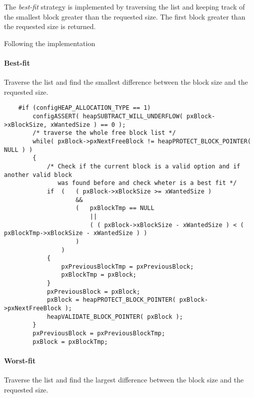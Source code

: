     The \textit{best-fit} strategy is implemented by traversing the list and keeping track of the smallest block greater than the requested size. The first block greater than the requested size is returned.

    Following the implementation

    \paragraph{Best-fit} Traverse the list and find the smallest difference between the block size and the requested size.

    \begin{codebox}
    \begin{lstlisting}
    #if (configHEAP_ALLOCATION_TYPE == 1)
        configASSERT( heapSUBTRACT_WILL_UNDERFLOW( pxBlock->xBlockSize, xWantedSize ) == 0 );
        /* traverse the whole free block list */
        while( pxBlock->pxNextFreeBlock != heapPROTECT_BLOCK_POINTER( NULL ) )
        {
            /* Check if the current block is a valid option and if another valid block
               was found before and check wheter is a best fit */
            if  (   ( pxBlock->xBlockSize >= xWantedSize )
                    &&
                    (   pxBlockTmp == NULL
                        ||
                        ( ( pxBlock->xBlockSize - xWantedSize ) < ( pxBlockTmp->xBlockSize - xWantedSize ) )
                    )
                )
            {
                pxPreviousBlockTmp = pxPreviousBlock;
                pxBlockTmp = pxBlock;
            }
            pxPreviousBlock = pxBlock;
            pxBlock = heapPROTECT_BLOCK_POINTER( pxBlock->pxNextFreeBlock );
            heapVALIDATE_BLOCK_POINTER( pxBlock );
        }
        pxPreviousBlock = pxPreviousBlockTmp;
        pxBlock = pxBlockTmp;
    \end{lstlisting}
    \end{codebox}

    \paragraph{Worst-fit} Traverse the list and find the largest difference between the block size and the requested size.

